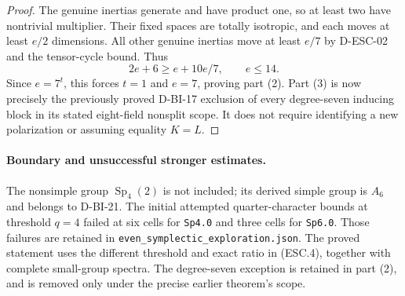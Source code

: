 \begin{proof}
The genuine inertias generate and have product one, so at
least two have nontrivial multiplier.  Their fixed spaces
are totally isotropic, and each moves at least $e/2$
dimensions.  All other genuine inertias move at least
$e/7$ by D-ESC-02 and the tensor-cycle bound.  Thus
\[
                    2e+6\ge e+10e/7,
                              \qquad e\le14.              \tag{ESC.9}
\]
Since $e=7^t$, this forces $t=1$ and $e=7$, proving part (2).
Part (3) is now precisely the previously proved D-BI-17
exclusion of every degree-seven inducing block in its
stated eight-field nonsplit scope.  It does not require
identifying a new polarization or assuming equality $K=L$.
\end{proof}

\paragraph{Boundary and unsuccessful stronger estimates.}
The nonsimple group $\operatorname{Sp}_4(2)$ is not included;
its derived simple group is $A_6$ and belongs to D-BI-21.
The initial attempted quarter-character bounds at threshold
$q=4$ failed at six cells for \texttt{Sp4.0} and three cells
for \texttt{Sp6.0}.  Those failures are retained in
\texttt{even\_symplectic\_exploration.json}.  The proved
statement uses the different threshold and exact ratio in
(ESC.4), together with complete small-group spectra.
The degree-seven exception is retained in part (2), and
is removed only under the precise earlier theorem's scope.
